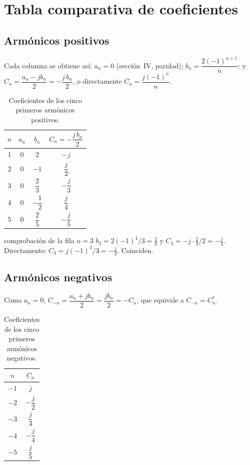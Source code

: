 \documentclass[11pt,a4paper]{article}
\begin{document}
\FloatBarrier
\section{Tabla comparativa de coeficientes}

\subsection{Armónicos positivos}
Cada columna se obtiene así: $a_n=0$ (sección~IV, paridad); $b_n=\dfrac{2(-1)^{n+1}}{n}$;
y $C_n=\dfrac{a_n-jb_n}{2}=-\dfrac{j\,b_n}{2}$, o directamente $C_n=\dfrac{j(-1)^{n}}{n}$.

\begin{table}[H]
\centering
\caption{Coeficientes de los cinco primeros armónicos positivos.}
\renewcommand{\arraystretch}{1.6}
\begin{tabular}{cccc}
\toprule
$n$ & $a_n$ & $b_n$ & $C_n=-\dfrac{j\,b_n}{2}$\\
\midrule
1 & 0 & $2$ & $-j$\\
2 & 0 & $-1$ & $\dfrac{j}{2}$\\
3 & 0 & $\dfrac{2}{3}$ & $-\dfrac{j}{3}$\\
4 & 0 & $-\dfrac{1}{2}$ & $\dfrac{j}{4}$\\
5 & 0 & $\dfrac{2}{5}$ & $-\dfrac{j}{5}$\\
\bottomrule
\end{tabular}
\end{table}

\begin{ejemplo}{comprobación de la fila $n=3$}
$b_3=2(-1)^{4}/3=\tfrac{2}{3}$ y $C_3=-j\cdot\tfrac{2}{3}/2=-\tfrac{j}{3}$. Directamente:
$C_3=j(-1)^{3}/3=-\tfrac{j}{3}$. Coinciden.
\end{ejemplo}

\subsection{Armónicos negativos}
Como $a_n=0$, $C_{-n}=\dfrac{a_n+jb_n}{2}=\dfrac{jb_n}{2}=-C_n$, que equivale a $C_{-n}=C_n^{*}$.

\begin{table}[H]
\centering
\caption{Coeficientes de los cinco primeros armónicos negativos.}
\renewcommand{\arraystretch}{1.6}
\begin{tabular}{cc}
\toprule
$n$ & $C_n$\\
\midrule
$-1$ & $j$\\
$-2$ & $-\dfrac{j}{2}$\\
$-3$ & $\dfrac{j}{3}$\\
$-4$ & $-\dfrac{j}{4}$\\
$-5$ & $\dfrac{j}{5}$\\
\bottomrule
\end{tabular}
\end{table}
\end{document}
